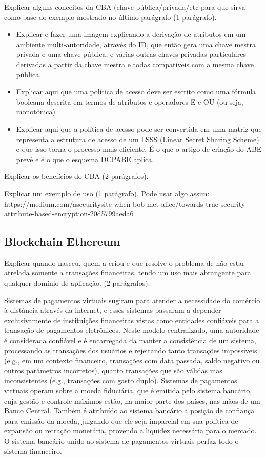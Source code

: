 \documentclass[a4paper,11pt]{article}
\begin{document}
{\color{ForestGreen}Explicar alguns conceitos da CBA (chave pública/privada/etc para que sirva como base do exemplo mostrado no último parágrafo (1 parágrafo).}

\begin{itemize}
  \item Explicar e fazer uma imagem explicando a derivação de atributos em um ambiente multi-autoridade, através do ID, que então gera uma chave mestra privada e uma chave pública, e várias outras chaves privadas particulares derivadas a partir da chave mestra e todas compatíveis com a mesma chave pública.
  \item Explicar aqui que uma política de acesso deve ser escrito como uma fórmula booleana descrita em termos de atributos e operadores E e OU (ou seja, monotônica)
  \item Explicar aqui que a política de acesso pode ser convertida em uma matriz que representa a estrutura de acesso de um LSSS (Linear Secret Sharing Scheme) e que isso torna o processo mais eficiente. É o que o artigo de criação do ABE prevê e é o que o esquema DCPABE aplica.
\end{itemize}

{\color{ForestGreen}Explicar os benefícios do CBA (2 parágrafos).}

{\color{ForestGreen}Explicar um exemplo de uso (1 parágrafo). Pode usar algo assim: https://medium.com/asecuritysite-when-bob-met-alice/towards-true-security-attribute-based-encryption-20d5799aeda6}

\subsection{Blockchain Ethereum}

{\color{ForestGreen}Explicar quando nasceu, quem a criou e que resolve o problema de não estar atrelada somente a transações financeiras, tendo um uso mais abrangente para qualquer domínio de aplicação. (2 parágrafos).}

 Sistemas de pagamentos virtuais sugiram para atender a necessidade do comércio à distância através da internet, e esses sistemas passaram a depender exclusivamente de instituições financeiras vistas como entidades confiáveis para a transação de pagamentos eletrônicos.
 Neste modelo centralizado, uma autoridade é considerada confiável e é encarregada da manter a consistência de um sistema, processando as transações dos usuários e rejeitando tanto transações impossíveis (e.g., em um contexto financeiro, transações com data passada, saldo negativo ou outros parâmetros incorretos), quanto transações que são válidas mas inconsistentes (e.g., transações com gasto duplo).
 Sistemas de pagamentos virtuais operam sobre a moeda fiduciária, que é emitida pelo sistema bancário, cuja gestão e controle máximos estão, na maior parte dos países, nas mãos de um Banco Central. Também é atribuído ao sistema bancário a posição de confiança para emissão da moeda, julgando que ele seja imparcial em sua política de expansão ou retração monetária, provendo a liquidez necessária para o mercado. O sistema bancário unido ao sistema de pagamentos virtuais perfaz todo o sistema financeiro.
\end{document}
